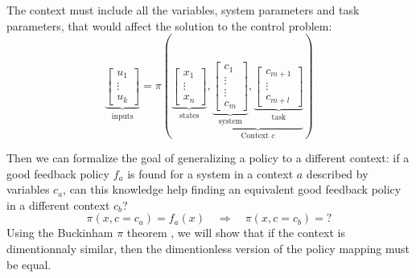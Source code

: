  The context must include all the variables, system parameters and task parameters, that would affect the solution to the control problem:
\begin{equation}
\underbrace{\begin{bmatrix}
u_1 \\
\vdots \\
u_k
\end{bmatrix}}_{\text{inputs}}
=
\pi \left(
\underbrace{\begin{bmatrix}
x_1 \\
\vdots \\
x_n
\end{bmatrix}}_{\text{states}}
,
\underbrace{
\underbrace{\begin{bmatrix}
c_1 \\
\vdots \\
\vdots \\
c_m
\end{bmatrix}}_{\text{system}}
,
\underbrace{\begin{bmatrix}
c_{m+1} \\
\vdots \\
c_{m+l}
\end{bmatrix}}_{\text{task}}
}_{\text{Context $c$}}
\right) 
\label{eq:vectorpolicy}
\end{equation}


Then we can formalize the goal of generalizing a policy to a different context: if a good feedback policy $f_a$ is found for a system in a context $a$ described by variables $c_a$, can this knowledge help finding an equivalent good feedback policy in a different context $c_b$?
\begin{equation}
\pi \left(
x,
c = c_a
\right) = 
f_a \left(
x 
\right) 
\quad \Rightarrow \quad
\pi \left(
x,
c = c_b
\right) = ?
\end{equation}
Using the Buckinham $\pi$ theorem \cite{buckingham_physically_1914}, we will show that if the context is dimentionnaly similar, then the dimentionless version of the policy mapping must be equal.



